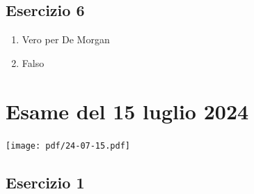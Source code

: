 \subsection*{Esercizio 6}
\begin{enumerate}[label=(\textit{\roman*})]
	\item Vero per De Morgan
	\item Falso
\end{enumerate}
\vfill

\section{Esame del 15 luglio 2024}
\begin{center}
	\texttt{[image: pdf/24-07-15.pdf]}
\end{center}
\subsection*{Esercizio 1}
